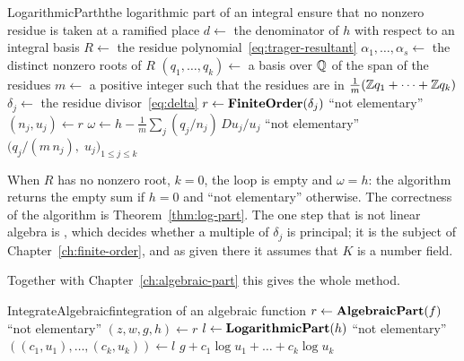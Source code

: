 \begin{algo}{LogarithmicPart}{h}{the logarithmic part of an integral}
\State ensure that no nonzero residue is taken at a ramified place 
\State $d \gets$ the denominator of $h$ with respect to an integral basis
\State $R \gets$ the residue polynomial~\eqref{eq:trager-resultant}
\State $\alpha_1, \dots, \alpha_s \gets$ the distinct nonzero roots of $R$ 
\State $(q_1, \dots, q_k) \gets$ a basis over $\mathbb{Q}$ of the span of the residues
\State $m \gets$ a positive integer such that the residues are in $\frac1m (\mathbb{Z} q_1 + \dots + \mathbb{Z} q_k)$
  \State $\delta_j \gets$ the residue divisor~\eqref{eq:delta}
  \State $r \gets \textbf{FiniteOrder}(\delta_j)$ 
   \Return ``not elementary'' \EndIf
  \State $(n_j, u_j) \gets r$
\EndFor
\State $\omega \gets h - \frac1m \sum_j (q_j / n_j)\, Du_j / u_j$
 \Return ``not elementary'' \EndIf
\State \Return $\bigl( q_j / (m\, n_j),\; u_j \bigr)_{1 \le j \le k}$
\end{algo}

When $R$ has no nonzero root, $k = 0$, the loop is empty and $\omega = h$: the
algorithm returns the empty sum if $h = 0$ and ``not elementary'' otherwise.
The correctness of the algorithm is Theorem~\ref{thm:log-part}. The one
step that is not linear algebra is , which
decides whether a multiple of $\delta_j$ is principal; it is the subject of
Chapter~\ref{ch:finite-order}, and as given there it assumes that $K$ is a
number field.

Together with Chapter~\ref{ch:algebraic-part} this gives the whole method.

\begin{algo}{IntegrateAlgebraic}{f}{integration of an algebraic function}
\State $r \gets \textbf{AlgebraicPart}(f)$
 \Return ``not elementary'' \EndIf
\State $(z, w, g, h) \gets r$
\State $l \gets \textbf{LogarithmicPart}(h)$ 
 \Return ``not elementary'' \EndIf
\State $((c_1, u_1), \dots, (c_k, u_k)) \gets l$
\State \Return $g + c_1 \log u_1 + \dots + c_k \log u_k$
\end{algo}

